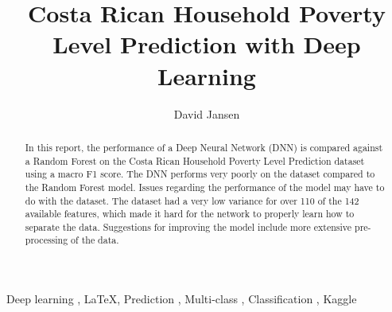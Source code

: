 \documentclass[preprint,12pt]{elsarticle}
\begin{document}
\begin{frontmatter}


\title{Costa Rican Household Poverty Level Prediction with Deep Learning}




\author{David Jansen}

\address{Groningen, Netherlands}

\begin{abstract}
In this report, the performance of a Deep Neural Network (DNN) is compared against a Random Forest on the Costa Rican Household Poverty Level Prediction dataset using a macro F1 score. The DNN performs very poorly on the dataset compared to the Random Forest model. Issues regarding the performance of the model may have to do with the dataset. The dataset had a very low variance for over 110 of the 142 available features, which made it hard for the network to properly learn how to separate the data. Suggestions for improving the model include more extensive pre-processing of the data.
\end{abstract}

\begin{keyword}
Deep learning \sep 
\LaTeX \sep 
Prediction \sep 
Multi-class \sep 
Classification \sep
Kaggle

\end{keyword}

\end{frontmatter}

\end{document}
